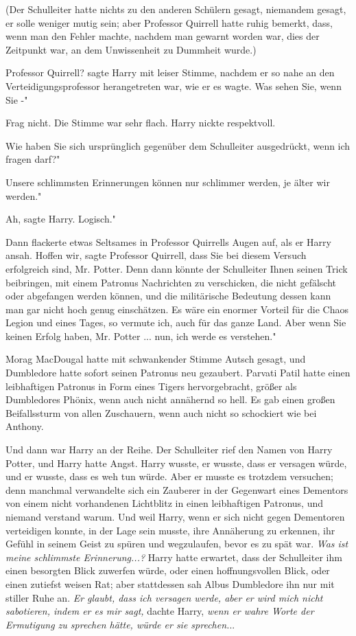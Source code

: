 (Der Schulleiter hatte nichts zu den anderen Schülern gesagt, niemandem gesagt,
er solle weniger mutig sein; aber Professor Quirrell hatte ruhig bemerkt, dass,
wenn man den Fehler machte, nachdem man gewarnt worden war, dies der Zeitpunkt
war, an dem Unwissenheit zu Dummheit wurde.)

\glqq Professor Quirrell?\grqq{} sagte Harry mit leiser Stimme, nachdem er so
nahe an den Verteidigungsprofessor herangetreten war, wie er es wagte. \glqq Was
sehen Sie, wenn Sie -"

\glqq Frag nicht.\grqq{} Die Stimme war sehr flach. Harry nickte respektvoll.

\glqq Wie haben Sie sich ursprünglich gegenüber dem Schulleiter ausgedrückt,
wenn ich fragen darf?"

\glqq Unsere schlimmsten Erinnerungen können nur schlimmer werden, je älter wir
werden."

\glqq Ah\grqq{}, sagte Harry. \glqq Logisch."

Dann flackerte etwas Seltsames in Professor Quirrells Augen auf, als er Harry
ansah. \glqq Hoffen wir\grqq{}, sagte Professor Quirrell, \glqq dass Sie bei
diesem Versuch erfolgreich sind, Mr. Potter. Denn dann könnte der Schulleiter
Ihnen seinen Trick beibringen, mit einem Patronus Nachrichten zu verschicken,
die nicht gefälscht oder abgefangen werden können, und die militärische
Bedeutung dessen kann man gar nicht hoch genug einschätzen. Es wäre ein enormer
Vorteil für die Chaos Legion und eines Tages, so vermute ich, auch für das ganze
Land. Aber wenn Sie keinen Erfolg haben, Mr. Potter ... nun, ich werde es
verstehen."

Morag MacDougal hatte mit schwankender Stimme \glqq Autsch\grqq{} gesagt, und
Dumbledore hatte sofort seinen Patronus neu gezaubert. Parvati Patil hatte einen
leibhaftigen Patronus in Form eines Tigers hervorgebracht, größer als
Dumbledores Phönix, wenn auch nicht annähernd so hell. Es gab einen großen
Beifallssturm von allen Zuschauern, wenn auch nicht so schockiert wie bei
Anthony.

Und dann war Harry an der Reihe. Der Schulleiter rief den Namen von Harry
Potter, und Harry hatte Angst. Harry wusste, er wusste, dass er versagen würde,
und er wusste, dass es weh tun würde. Aber er musste es trotzdem versuchen; denn
manchmal verwandelte sich ein Zauberer in der Gegenwart eines Dementors von
einem nicht vorhandenen Lichtblitz in einen leibhaftigen Patronus, und niemand
verstand warum. Und weil Harry, wenn er sich nicht gegen Dementoren verteidigen
konnte, in der Lage sein musste, ihre Annäherung zu erkennen, ihr Gefühl in
seinem Geist zu spüren und wegzulaufen, bevor es zu spät war. \emph{ Was ist
meine schlimmste Erinnerung...? }Harry hatte erwartet, dass der Schulleiter ihm
einen besorgten Blick zuwerfen würde, oder einen hoffnungsvollen Blick, oder
einen zutiefst weisen Rat; aber stattdessen sah Albus Dumbledore ihn nur mit
stiller Ruhe an. \emph{ Er glaubt, dass ich versagen werde, aber er wird mich
nicht sabotieren, indem er es mir sagt,} dachte Harry, \emph{wenn er wahre Worte
der Ermutigung zu sprechen hätte, würde er sie sprechen.}..

